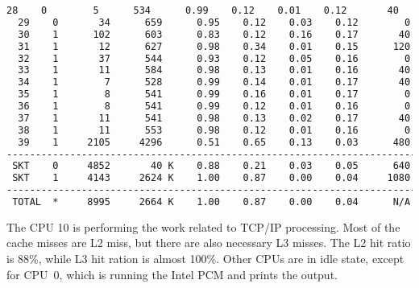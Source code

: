 \begin{lstlisting}[language=TeX]
  28    0        5      534      0.99    0.12    0.01    0.12       40
  29    0       34      659      0.95    0.12    0.03    0.12        0
  30    1      102      603      0.83    0.12    0.16    0.17       40
  31    1       12      627      0.98    0.34    0.01    0.15      120
  32    1       37      544      0.93    0.12    0.05    0.16        0
  33    1       11      584      0.98    0.13    0.01    0.16       40
  34    1        7      528      0.99    0.14    0.01    0.17       40
  35    1        8      541      0.99    0.16    0.01    0.17        0
  36    1        8      541      0.99    0.12    0.01    0.16        0
  37    1       11      541      0.98    0.13    0.02    0.17       40
  38    1       11      553      0.98    0.12    0.01    0.16        0
  39    1     2105     4296      0.51    0.65    0.13    0.03      480
-------------------------------------------------------------------------
 SKT    0     4852       40 K    0.88    0.21    0.03    0.05      640
 SKT    1     4143     2624 K    1.00    0.87    0.00    0.04     1080
-------------------------------------------------------------------------
 TOTAL  *     8995     2664 K    1.00    0.87    0.00    0.04      N/A
\end{lstlisting}
The CPU 10 is performing the work related to TCP/IP processing.
Most of the cache misses are L2 miss, but there are also necessary L3 misses.
The L2 hit ratio is 88\%, while L3 hit ration is almost 100\%.
Other CPUs are in idle state, except for CPU~0, which is running the Intel PCM and prints the output.
